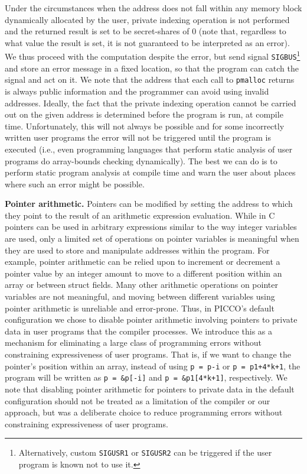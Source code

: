 \documentclass[11pt]{article}
\begin{document}
Under the circumstances when the address  does not fall within
any memory block dynamically allocated by the user, private indexing
operation is not performed and the returned result is set to be
secret-shares of 0 (note that, regardless to what value the result is
set, it is not guaranteed to be interpreted as an error). We thus
proceed with the computation despite the error, but send signal
\texttt{SIGBUS}\footnote{Alternatively, custom \texttt{SIGUSR1} or
\texttt{SIGUSR2} can be triggered if the user program is known not to
use it.} and store an error message in a fixed location, so that the
program can catch the signal and act on it. We note that the address
that each call to \texttt{pmalloc} returns is always public
information and the programmer can avoid using invalid addresses.
Ideally, the fact that the private indexing operation cannot be
carried out on the given address is determined before the program is
run, at compile time. Unfortunately, this will not always be possible
and for some incorrectly written user programs the error will not be
triggered until the program is executed (i.e., even programming
languages that perform static analysis of user programs do
array-bounds checking dynamically). The best we can do is to perform
static program analysis at compile time and warn the user about places
where such an error might be possible. 

\medskip \noindent \textbf{Pointer arithmetic.} Pointers can be modified
by setting the address to which they point to the result of an arithmetic
expression evaluation. While in C pointers can be used in arbitrary
expressions similar to the way integer variables are used, only a limited
set of operations on pointer variables is meaningful when they are used to 
store and manipulate addresses within the program. For example, pointer
arithmetic can be relied upon to increment or decrement a pointer value by
an integer amount to move to a different position within an array or between
struct fields. Many other arithmetic operations on pointer variables are not
meaningful, and moving between different variables using pointer arithmetic
is unreliable and error-prone. Thus, in PICCO's default configuration we
chose to disable pointer arithmetic involving pointers to private data in
user programs that the compiler processes. We introduce this as a mechanism
for eliminating a large class of programming errors without constraining
expressiveness of user programs. That is, if we want to change the pointer's
position within an array, instead of using \texttt{p = p-i} or \texttt{p =
p1+4*k+1}, the program will be written as \texttt{p = \&p[-i]} and \texttt{p
= \&p1[4*k+1]}, respectively. We note that disabling pointer arithmetic for
pointers to private data in the default configuration should not be treated
as a limitation of the compiler or our approach, but was a deliberate choice
to reduce programming errors without constraining expressiveness of user
programs.
\end{document}
